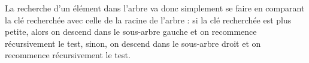 \documentclass[11pt,a4paper]{article}
\begin{document}
La recherche d'un élément dans l'arbre va donc simplement se faire en comparant la clé recherchée avec celle de la racine de l'arbre : si la clé recherchée est plus petite, alors on descend dans le sous-arbre gauche et on recommence récursivement le test, sinon, on descend dans le sous-arbre droit et on recommence récursivement le test.




\vspace{-0.5cm}
\end{document}
